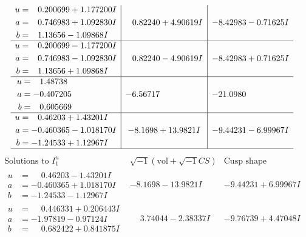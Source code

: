 \documentclass[1p]{elsarticle_modified}
\theoremstyle{definition}
\newcommand{\I}{\sqrt{-1}}
\begin{document}
$$\begin{array}{c|c|c}
\begin{aligned}
u &= \phantom{-}0.200699 + 1.177200 I \\
a &= \phantom{-}0.746983 + 1.092830 I \\
b &= \phantom{-}1.13656 - 1.09868 I\end{aligned}
 & \phantom{-}0.82240 + 4.90619 I & -8.42983 - 0.71625 I \\ \hline\begin{aligned}
u &= \phantom{-}0.200699 - 1.177200 I \\
a &= \phantom{-}0.746983 - 1.092830 I \\
b &= \phantom{-}1.13656 + 1.09868 I\end{aligned}
 & \phantom{-}0.82240 - 4.90619 I & -8.42983 + 0.71625 I \\ \hline\begin{aligned}
u &= \phantom{-}1.48738\phantom{ +0.000000I} \\
a &= -0.407205\phantom{ +0.000000I} \\
b &= \phantom{-}0.605669\phantom{ +0.000000I}\end{aligned}
 & -6.56717\phantom{ +0.000000I} & -21.0980\phantom{ +0.000000I} \\ \hline\begin{aligned}
u &= \phantom{-}0.46203 + 1.43201 I \\
a &= -0.460365 - 1.018170 I \\
b &= -1.24533 + 1.12967 I\end{aligned}
 & -8.1698 + 13.9821 I & -9.44231 - 6.99967 I\\
 \hline 
 \end{array}$$\newpage$$\begin{array}{c|c|c}  
\text{Solutions to }I^u_{1}& \I (\text{vol} + \sqrt{-1}CS) & \text{Cusp shape}\\
 \hline 
\begin{aligned}
u &= \phantom{-}0.46203 - 1.43201 I \\
a &= -0.460365 + 1.018170 I \\
b &= -1.24533 - 1.12967 I\end{aligned}
 & -8.1698 - 13.9821 I & -9.44231 + 6.99967 I \\ \hline\begin{aligned}
u &= \phantom{-}0.446331 + 0.206443 I \\
a &= -1.97819 - 0.97124 I \\
b &= \phantom{-}0.682422 + 0.841875 I\end{aligned}
 & \phantom{-}3.74044 - 2.38337 I & -9.76739 + 4.47048 I \\ \hline\begin{aligned}

\end{aligned}
\end{array}$$
\end{document}
